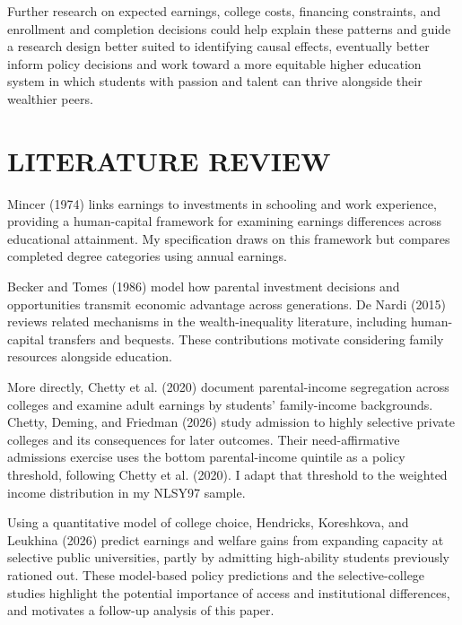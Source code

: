 \documentclass[12pt,letterpaper]{article}
\begin{document}
Further research on expected earnings, college costs, financing constraints, 
and enrollment and completion decisions could help explain these patterns and guide a 
research design better suited to identifying causal effects, eventually better inform
policy decisions and work toward a more equitable higher education system in which students
with passion and talent can thrive alongside their wealthier peers.

\section*{LITERATURE REVIEW}

Mincer (1974) links earnings to investments in schooling and work experience,
providing a human-capital framework for examining earnings differences across
educational attainment. My specification draws on this framework but compares
completed degree categories using annual earnings. \newline

Becker and Tomes (1986) model how parental investment decisions and opportunities
transmit economic advantage across generations. De Nardi (2015) reviews related
mechanisms in the wealth-inequality literature, including human-capital transfers
and bequests. These contributions motivate considering family resources alongside
education. \newline

More directly, Chetty et al. (2020) document parental-income segregation across
colleges and examine adult earnings by students' family-income backgrounds.
Chetty, Deming, and Friedman (2026) study admission to highly selective private
colleges and its consequences for later outcomes. Their need-affirmative admissions
exercise uses the bottom parental-income quintile as a policy threshold, following
Chetty et al. (2020). I adapt that threshold to the weighted income distribution in
my NLSY97 sample. \newline

Using a quantitative model of college choice, Hendricks, Koreshkova, and Leukhina
(2026) predict earnings and welfare gains from expanding capacity at selective
public universities, partly by admitting high-ability students previously rationed
out. These model-based policy predictions and the selective-college studies
highlight the potential importance of access and institutional differences, 
and motivates a follow-up analysis of this paper.\newline
\end{document}
